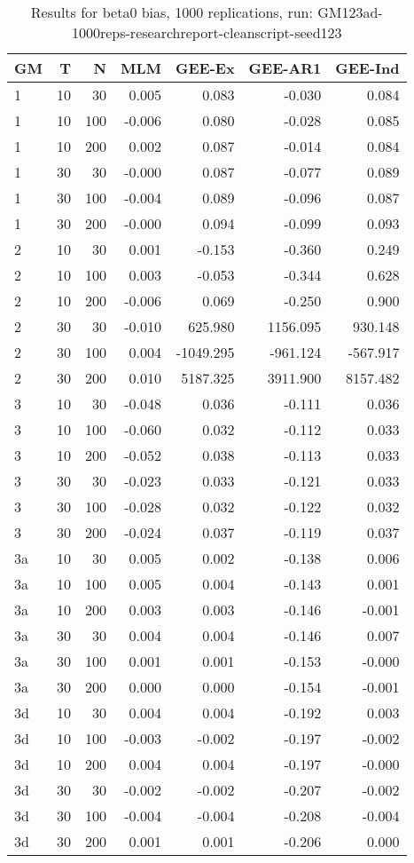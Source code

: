 \begin{table}[ht]
\centering
\begin{tabular}{lrrrrrr}
  \hline
GM & T & N & MLM & GEE-Ex & GEE-AR1 & GEE-Ind \\ 
  \hline
1 & 10 & 30 & 0.005 & 0.083 & -0.030 & 0.084 \\ 
  1 & 10 & 100 & -0.006 & 0.080 & -0.028 & 0.085 \\ 
  1 & 10 & 200 & 0.002 & 0.087 & -0.014 & 0.084 \\ 
  1 & 30 & 30 & -0.000 & 0.087 & -0.077 & 0.089 \\ 
  1 & 30 & 100 & -0.004 & 0.089 & -0.096 & 0.087 \\ 
  1 & 30 & 200 & -0.000 & 0.094 & -0.099 & 0.093 \\ 
  2 & 10 & 30 & 0.001 & -0.153 & -0.360 & 0.249 \\ 
  2 & 10 & 100 & 0.003 & -0.053 & -0.344 & 0.628 \\ 
  2 & 10 & 200 & -0.006 & 0.069 & -0.250 & 0.900 \\ 
  2 & 30 & 30 & -0.010 & 625.980 & 1156.095 & 930.148 \\ 
  2 & 30 & 100 & 0.004 & -1049.295 & -961.124 & -567.917 \\ 
  2 & 30 & 200 & 0.010 & 5187.325 & 3911.900 & 8157.482 \\ 
  3 & 10 & 30 & -0.048 & 0.036 & -0.111 & 0.036 \\ 
  3 & 10 & 100 & -0.060 & 0.032 & -0.112 & 0.033 \\ 
  3 & 10 & 200 & -0.052 & 0.038 & -0.113 & 0.033 \\ 
  3 & 30 & 30 & -0.023 & 0.033 & -0.121 & 0.033 \\ 
  3 & 30 & 100 & -0.028 & 0.032 & -0.122 & 0.032 \\ 
  3 & 30 & 200 & -0.024 & 0.037 & -0.119 & 0.037 \\ 
  3a & 10 & 30 & 0.005 & 0.002 & -0.138 & 0.006 \\ 
  3a & 10 & 100 & 0.005 & 0.004 & -0.143 & 0.001 \\ 
  3a & 10 & 200 & 0.003 & 0.003 & -0.146 & -0.001 \\ 
  3a & 30 & 30 & 0.004 & 0.004 & -0.146 & 0.007 \\ 
  3a & 30 & 100 & 0.001 & 0.001 & -0.153 & -0.000 \\ 
  3a & 30 & 200 & 0.000 & 0.000 & -0.154 & -0.001 \\ 
  3d & 10 & 30 & 0.004 & 0.004 & -0.192 & 0.003 \\ 
  3d & 10 & 100 & -0.003 & -0.002 & -0.197 & -0.002 \\ 
  3d & 10 & 200 & 0.004 & 0.004 & -0.197 & -0.000 \\ 
  3d & 30 & 30 & -0.002 & -0.002 & -0.207 & -0.002 \\ 
  3d & 30 & 100 & -0.004 & -0.004 & -0.208 & -0.004 \\ 
  3d & 30 & 200 & 0.001 & 0.001 & -0.206 & 0.000 \\ 
   \hline
\end{tabular}
\caption{Results for beta0 bias, 1000 replications, run: GM123ad-1000reps-researchreport-cleanscript-seed123} 
\label{tab:beta0_bias}
\end{table}

